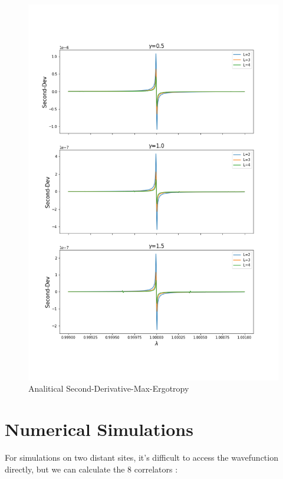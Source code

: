 \documentclass[12pt,a4paper]{book}
\theoremstyle{definition}
\begin{document}
\begin{figure}
	\includegraphics[width=\linewidth]{graphs/Seconddev_234_3gammas}
	\caption{Analitical Second-Derivative-Max-Ergotropy}
	\label{fig:seconddev2343gammas}
\end{figure}






\clearpage
\chapter{Numerical Simulations}
For simulations on two distant sites, it's difficult to access the wavefunction directly, but we can calculate the 8 correlators :
\end{document}
